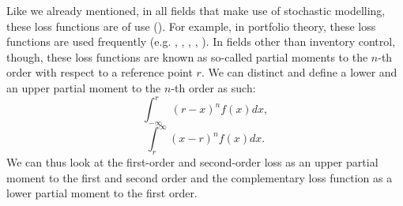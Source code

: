\documentclass{article}
\begin{document}
\begin{flushleft}
    Like we already mentioned, in all fields that make use of stochastic modelling, these loss functions are of use (\cite{b07c7eb1-7b50-3adc-9ee9-442be763eb69}).
    For example, in portfolio theory, these loss functions are used frequently (e.g. \cite{Burnecki2005}, \cite{Chen01102011}, \cite{02d5ea92-1a76-39f3-92d6-b5f587e3ae55}, \cite{d729dae9-eb3a-3171-85b1-0f6d6818b172}, \cite{articleSuno}).
    In fields other than inventory control, though, these loss functions are known as so-called partial moments to the $n$-th order with respect to a reference point $r$.
    We can distinct and define a lower and an upper partial moment to the $n$-th order as such:
    \begin{equation*}
        \int_{-\infty}^{r}(r-x)^nf(x)dx,
    \end{equation*}
    \begin{equation*}
        \int_{r}^{\infty}(x-r)^nf(x)dx.
    \end{equation*}
    We can thus look at the first-order and second-order loss as an upper partial moment to the first and second order and the complementary loss function as a lower partial moment to the first order.
\end{flushleft}
\end{document}

